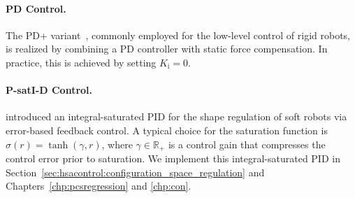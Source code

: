 \paragraph{PD Control.} The PD+ variant~\citep{kelly1997pd}, commonly employed for the low-level control of rigid robots, is realized by combining a PD controller with static force compensation. In practice, this is achieved by setting $K_\mathrm{i} = 0$.

\paragraph{P-satI-D Control.} \citet{pustina2022p} introduced an integral-saturated PID for the shape regulation of soft robots via error-based feedback control. A typical choice for the saturation function is $\sigma(r) = \tanh(\gamma , r)$, where $\gamma \in \mathbb{R}_+$ is a control gain that compresses the control error prior to saturation. We implement this integral-saturated PID in Section~\ref{sec:hsacontrol:configuration_space_regulation} and Chapters~\ref{chp:pcsregression} and \ref{chp:con}.

